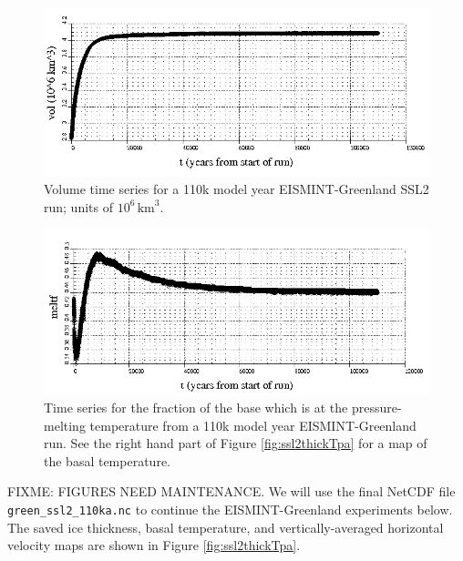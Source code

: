 \documentclass[11pt,final]{amsart}
\begin{document}
\begin{figure}[ht]
\includegraphics[width=6.0in,keepaspectratio=true]{eisgrn_volseries}
\caption{Volume time series for a 110k model year EISMINT-Greenland SSL2 run; units of $10^{6}\,\text{km}^3$.}
\label{fig:eisgrnvolseries}
\end{figure}

\begin{figure}[ht]
\includegraphics[width=6.0in,keepaspectratio=true]{eisgrn_meltfseries}
\caption{Time series for the fraction of the base which is at the pressure-melting temperature from a 110k model year EISMINT-Greenland run.  See the right hand part of Figure \ref{fig:ssl2thickTpa} for a map of the basal temperature.}
\label{fig:eisgrnmeltfseries}
\end{figure}

FIXME:  FIGURES NEED MAINTENANCE.   We will use the final NetCDF file \verb|green_ssl2_110ka.nc| to continue the EISMINT-Greenland experiments below.  The saved ice thickness, basal temperature, and vertically-averaged horizontal velocity maps are shown in Figure \ref{fig:ssl2thickTpa}.
\end{document}
